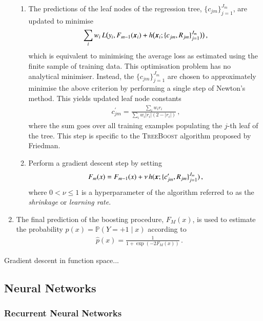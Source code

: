 \begin{enumerate}
\begin{enumerate}
  \item The predictions of the leaf nodes of the regression tree,
    $\{c_{jm}\}_{j=1}^{J_{m}}$, are updated to minimise
    \begin{align*}
      \sum_i w_i \, L\bigl( y_i, F_{m - 1}(\myvec{x}_i)
      + h\bigl( \myvec{x}_i; \{c_{jm}, R_{jm}\}_{j=1}^{J_{m}} \bigr) \bigr)
      \,\text{,}
    \end{align*}
    which is equivalent to minimising the average loss as estimated using the
    finite sample of training data. This optimisation problem has no analytical
    minimiser. Instead, the $\{c_{jm}\}_{j=1}^{J_{m}}$ are chosen to
    approximately minimise the above criterion by performing a single step of
    Newton's method. This yields updated leaf node constants
    \begin{align*}
      c_{jm}^\prime = \frac{ \sum_i w_i r_i }{ \sum_i w_i |r_i| (2 - |r_i|)} \,\text{,}
    \end{align*}
    where the sum goes over all training examples populating the $j$-th leaf of
    the tree. This step is specific to the \textsc{TreeBoost} algorithm proposed
    by Friedman.

  \item Perform a gradient descent step by setting
    \begin{align*}
      F_m(x) = F_{m - 1}(x) + \nu \, h(\myvec{x}; \{c_{jm}^\prime, R_{jm}\}_{j=1}^{J_{m}}) \,\text{,}
    \end{align*}
    where $0 < \nu \leq 1$ is a hyperparameter of the algorithm referred to as
    the \emph{shrinkage} or \emph{learning rate}.  

  \end{enumerate}

\item The final prediction of the boosting procedure, $F_{M}(x)$, is used to
  estimate the probability $p(x) = \mathbb{P}(Y = +1 \mid x)$ according to
  \begin{align*}
    \hat{p}(x) = \frac{1}{1 + \exp(-2 F_{M}(x))} \,\text{.}
  \end{align*}
\end{enumerate}

Gradient descent in function space...


\subsection{Neural Networks}

\subsubsection{Recurrent Neural Networks}%
\label{sec:rnn}


